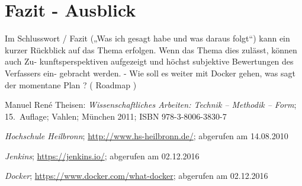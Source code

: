 \documentclass[12pt,toc=bib,toc=listof]{scrreprt}
\begin{document}
\chapter{Fazit - Ausblick} %
\label{sec:fazit}
Im Schlusswort / Fazit („Was ich gesagt habe und was daraus folgt“) kann ein kurzer
Rückblick auf das Thema erfolgen. Wenn das Thema dies zulässt, können auch Zu-
kunftsperspektiven aufgezeigt und höchst subjektive Bewertungen des Verfassers ein-
gebracht werden.
- Wie soll es weiter mit Docker gehen, was sagt der momentane Plan ? ( Roadmap )


\appendix
\begin{thebibliography}{99}
\raggedright
 Manuel René Theisen:
 \emph{Wissenschaftliches Arbeiten: Technik -- Methodik -- Form};
 15.~Auflage; Vahlen; München 2011;
 ISBN 978-3-8006-3830-7

 \emph{Hochschule Heilbronn};
 \url{http://www.hs-heilbronn.de/};
 abgerufen am 14.08.2010
 
 \emph{Jenkins};
 \url{https://jenkins.io/};
 abgerufen am 02.12.2016
 
 \emph{Docker};
 \url{https://www.docker.com/what-docker};
 abgerufen am 02.12.2016

 
 
 
 
 
 
\end{thebibliography}
\end{document}

